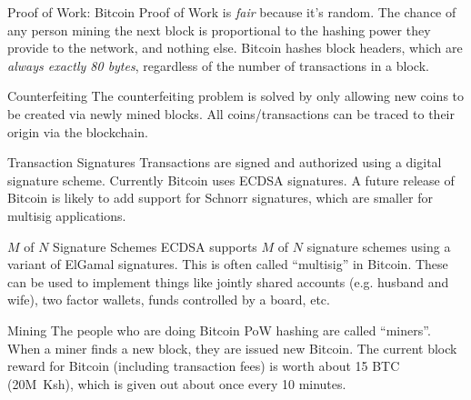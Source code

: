 \documentclass[14pt]{beamer}
\begin{document}
\begin{frame}{Proof of Work: Bitcoin}
  Proof of Work is \emph{fair} because it's random.
  \newline
  \newline
  The chance of any person mining the next block is proportional to the hashing
  power they provide to the network, and nothing else.
  \newline
  \newline
  Bitcoin hashes block headers, which are \emph{always exactly 80 bytes},
  regardless of the number of transactions in a block.
\end{frame}

\begin{frame}{Counterfeiting}
  The counterfeiting problem is solved by only allowing new coins to be created
  via newly mined blocks.
  \newline
  \newline
  All coins/transactions can be traced to their origin via the blockchain.
\end{frame}

\begin{frame}{Transaction Signatures}
  Transactions are signed and authorized using a digital signature scheme.
  \newline
  \newline
  Currently Bitcoin uses ECDSA signatures. A future release of Bitcoin is likely
  to add support for Schnorr signatures, which are smaller for multisig
  applications.
\end{frame}

\begin{frame}{$M$ of $N$ Signature Schemes}
  ECDSA supports $M$ of $N$ signature schemes using a variant of ElGamal
  signatures. This is often called ``multisig'' in Bitcoin.
  \newline
  \newline
  These can be used to implement things like jointly shared accounts (e.g.
  husband and wife), two factor wallets, funds controlled by a board, etc.
\end{frame}

\begin{frame}{Mining}
  The people who are doing Bitcoin PoW hashing are called ``miners''. When a
  miner finds a new block, they are issued new Bitcoin.
  \newline
  \newline
  The current block reward for Bitcoin (including transaction fees) is worth
  about 15 BTC (20M~Ksh), which is given out about once every 10 minutes.
\end{frame}
\end{document}
